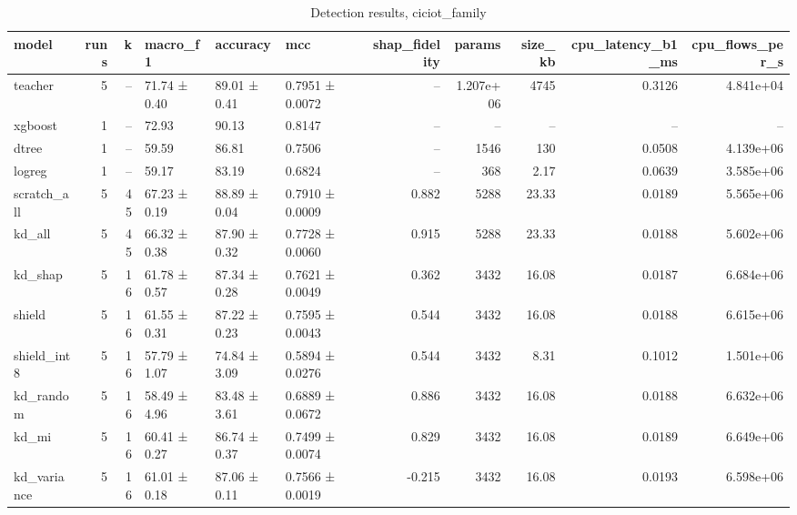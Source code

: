 \begin{table}
\caption{Detection results, ciciot_family}
\begin{tabular}{lrrlllrrrrr}
\toprule
model & runs & k & macro_f1 & accuracy & mcc & shap_fidelity & params & size_kb & cpu_latency_b1_ms & cpu_flows_per_s \\
\midrule
teacher & 5 & -- & 71.74 ± 0.40 & 89.01 ± 0.41 & 0.7951 ± 0.0072 & -- & 1.207e+06 & 4745 & 0.3126 & 4.841e+04 \\
xgboost & 1 & -- & 72.93 & 90.13 & 0.8147 & -- & -- & -- & -- & -- \\
dtree & 1 & -- & 59.59 & 86.81 & 0.7506 & -- & 1546 & 130 & 0.0508 & 4.139e+06 \\
logreg & 1 & -- & 59.17 & 83.19 & 0.6824 & -- & 368 & 2.17 & 0.0639 & 3.585e+06 \\
scratch_all & 5 & 45 & 67.23 ± 0.19 & 88.89 ± 0.04 & 0.7910 ± 0.0009 & 0.882 & 5288 & 23.33 & 0.0189 & 5.565e+06 \\
kd_all & 5 & 45 & 66.32 ± 0.38 & 87.90 ± 0.32 & 0.7728 ± 0.0060 & 0.915 & 5288 & 23.33 & 0.0188 & 5.602e+06 \\
kd_shap & 5 & 16 & 61.78 ± 0.57 & 87.34 ± 0.28 & 0.7621 ± 0.0049 & 0.362 & 3432 & 16.08 & 0.0187 & 6.684e+06 \\
shield & 5 & 16 & 61.55 ± 0.31 & 87.22 ± 0.23 & 0.7595 ± 0.0043 & 0.544 & 3432 & 16.08 & 0.0188 & 6.615e+06 \\
shield_int8 & 5 & 16 & 57.79 ± 1.07 & 74.84 ± 3.09 & 0.5894 ± 0.0276 & 0.544 & 3432 & 8.31 & 0.1012 & 1.501e+06 \\
kd_random & 5 & 16 & 58.49 ± 4.96 & 83.48 ± 3.61 & 0.6889 ± 0.0672 & 0.886 & 3432 & 16.08 & 0.0188 & 6.632e+06 \\
kd_mi & 5 & 16 & 60.41 ± 0.27 & 86.74 ± 0.37 & 0.7499 ± 0.0074 & 0.829 & 3432 & 16.08 & 0.0189 & 6.649e+06 \\
kd_variance & 5 & 16 & 61.01 ± 0.18 & 87.06 ± 0.11 & 0.7566 ± 0.0019 & -0.215 & 3432 & 16.08 & 0.0193 & 6.598e+06 \\
\bottomrule
\end{tabular}
\end{table}
